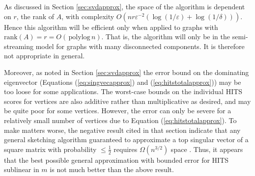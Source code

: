\documentclass{report}
\newcommand{\polylog}{\, \mathrm{polylog} \,}
\newcommand{\rank}{\mathrm{rank}}
\begin{document}
As discussed in Section \ref{sec:svdapprox}, the space of the algorithm is dependent on $r$, the rank of $A$, with complexity $O(nr\varepsilon^{-2}(\log(1/\varepsilon) + \log(1/\delta)))$.
Hence this algorithm will be efficient only when applied to graphs with $\rank(A) = r = O(\polylog n)$.
That is, the algorithm will only be in the semi-streaming model for graphs with many disconnected components. 
It is therefore not appropriate in general. 





Moreover, as noted in Section \ref{sec:svdapprox} the error bound on the dominating eigenvector (Equations (\ref{eq:singvecapprox}) and (\ref{eq:hitstotalapprox})) may be too loose for some applications.
The worst-case bounds on the individual HITS scores for vertices are also additive rather than multiplicative as desired, and may be quite poor for some vertices.
However, the error can only be severe for a relatively small number of vertices due to Equation (\ref{eq:hitstotalapprox}).
To make matters worse, the negative result cited in that section indicate that any general sketching algorithm guaranteed to approximate a top singular vector of a square matrix with probability $\leq \frac{1}{2}$ requires $\Omega(n^{3/2})$ space \cite{li2014sketching}.  
Thus, it appears that the best possible general approximation with bounded error for HITS sublinear in $m$ is not much better than the above result. 
\end{document}
